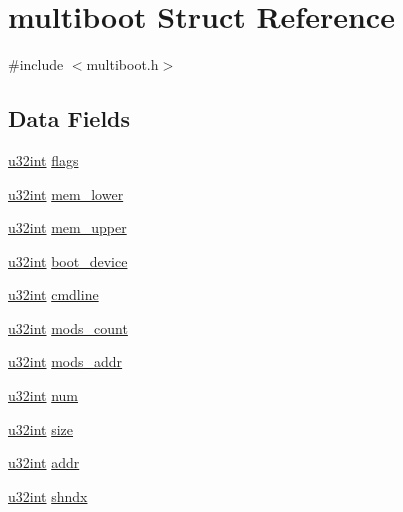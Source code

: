 \hypertarget{structmultiboot}{}\section{multiboot Struct Reference}
\label{structmultiboot}


{\ttfamily \#include $<$multiboot.\+h$>$}

\subsection*{Data Fields}
\begin{DoxyCompactItemize}
\item 
\hyperlink{common_8h_a7ae3a26c17ddfe117c6291739780801d}{u32int} \hyperlink{structmultiboot_aa9c5426efeb4263ba260453ae8a83766}{flags}
\item 
\hyperlink{common_8h_a7ae3a26c17ddfe117c6291739780801d}{u32int} \hyperlink{structmultiboot_a0c2b38f61acbb8bce9a3816bea3dceb0}{mem\+\_\+lower}
\item 
\hyperlink{common_8h_a7ae3a26c17ddfe117c6291739780801d}{u32int} \hyperlink{structmultiboot_a914ffaeaee2f44eea822a3808f6bfc44}{mem\+\_\+upper}
\item 
\hyperlink{common_8h_a7ae3a26c17ddfe117c6291739780801d}{u32int} \hyperlink{structmultiboot_aa18ec4a3b40666f5319a43e0f39e4db6}{boot\+\_\+device}
\item 
\hyperlink{common_8h_a7ae3a26c17ddfe117c6291739780801d}{u32int} \hyperlink{structmultiboot_a7849d17666a4fd87e1e778d55b5d8bbc}{cmdline}
\item 
\hyperlink{common_8h_a7ae3a26c17ddfe117c6291739780801d}{u32int} \hyperlink{structmultiboot_ada80fcb4010059d70a52699358c2f532}{mods\+\_\+count}
\item 
\hyperlink{common_8h_a7ae3a26c17ddfe117c6291739780801d}{u32int} \hyperlink{structmultiboot_abe70fd1a6a91264074d8892a28aecaa1}{mods\+\_\+addr}
\item 
\hyperlink{common_8h_a7ae3a26c17ddfe117c6291739780801d}{u32int} \hyperlink{structmultiboot_a3ac1437ae93564fce66f26fc4263d8ac}{num}
\item 
\hyperlink{common_8h_a7ae3a26c17ddfe117c6291739780801d}{u32int} \hyperlink{structmultiboot_a425167758dbbf33818af5cc6c46c8a62}{size}
\item 
\hyperlink{common_8h_a7ae3a26c17ddfe117c6291739780801d}{u32int} \hyperlink{structmultiboot_a4d918603df569ac9a6dd1f1f51b69afd}{addr}
\item 
\hyperlink{common_8h_a7ae3a26c17ddfe117c6291739780801d}{u32int} \hyperlink{structmultiboot_ac2da230048a20331b735182dddb67cf7}{shndx}

\end{DoxyCompactItemize}
